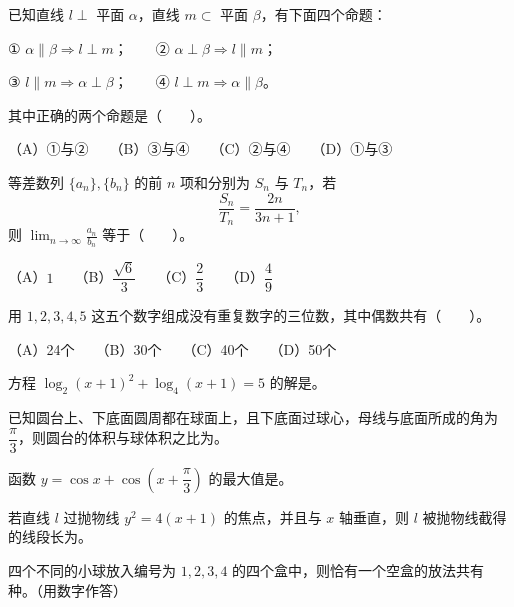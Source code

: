 \begin{question}
已知直线 $l\perp$ 平面 $\alpha$，直线 $m\subset$ 平面 $\beta$，有下面四个命题：

① $\alpha\parallel\beta\Rightarrow l\perp m$；　　② $\alpha\perp\beta\Rightarrow l\parallel m$；

③ $l\parallel m\Rightarrow\alpha\perp\beta$；　　④ $l\perp m\Rightarrow\alpha\parallel\beta$。

其中正确的两个命题是\mbox{（　　）}。

（A）①与②　　（B）③与④　　（C）②与④　　（D）①与③

\end{question}
\begin{question}
等差数列 $\{a_n\},\{b_n\}$ 的前 $n$ 项和分别为 $S_n$ 与 $T_n$，若
\nopagebreak[4]
\[
\frac{S_n}{T_n}=\frac{2n}{3n+1},
\]
则 $\displaystyle\lim_{n\to\infty}\frac{a_n}{b_n}$ 等于\mbox{（　　）}。

（A）$1$　　（B）$\dfrac{\sqrt6}{3}$　　（C）$\dfrac23$　　（D）$\dfrac49$

\end{question}
\begin{question}
用 $1,2,3,4,5$ 这五个数字组成没有重复数字的三位数，其中偶数共有\mbox{（　　）}。

（A）24个　　（B）30个　　（C）40个　　（D）50个

\end{question}
\begin{question}
方程 $\log_2(x+1)^2+\log_4(x+1)=5$ 的解是\underline{\qquad\qquad}。

\end{question}
\begin{question}
已知圆台上、下底面圆周都在球面上，且下底面过球心，母线与底面所成的角为 $\dfrac\pi3$，则圆台的体积与球体积之比为\underline{\qquad\qquad}。

\end{question}
\begin{question}
函数 $y=\cos x+\cos\left(x+\dfrac\pi3\right)$ 的最大值是\underline{\qquad\qquad}。

\end{question}
\begin{question}
若直线 $l$ 过抛物线 $y^2=4(x+1)$ 的焦点，并且与 $x$ 轴垂直，则 $l$ 被抛物线截得的线段长为\underline{\qquad\qquad}。

\end{question}
\begin{question}
四个不同的小球放入编号为 $1,2,3,4$ 的四个盒中，则恰有一个空盒的放法共有\underline{\qquad\qquad}种。（用数字作答）

\end{question}
